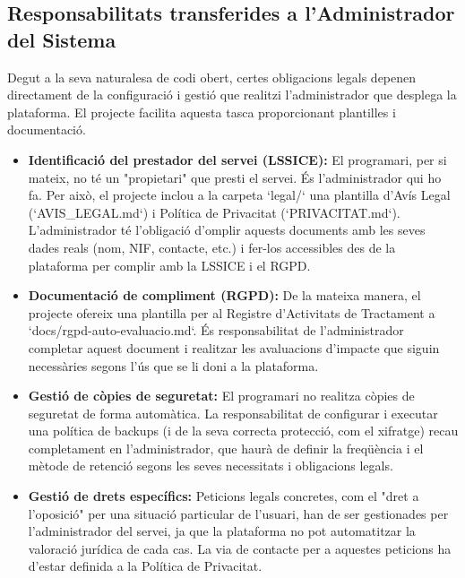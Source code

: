 \subsection{Responsabilitats transferides a l'Administrador del Sistema}

Degut a la seva naturalesa de codi obert, certes obligacions legals depenen directament de la configuració i gestió que realitzi l'administrador que desplega la plataforma. El projecte facilita aquesta tasca proporcionant plantilles i documentació.

\begin{itemize}
    \item \textbf{Identificació del prestador del servei (LSSICE):} El programari, per si mateix, no té un "propietari" que presti el servei. És l'administrador qui ho fa. Per això, el projecte inclou a la carpeta `legal/` una plantilla d'Avís Legal (`AVIS_LEGAL.md`) i Política de Privacitat (`PRIVACITAT.md`). L'administrador té l'obligació d'omplir aquests documents amb les seves dades reals (nom, NIF, contacte, etc.) i fer-los accessibles des de la plataforma per complir amb la LSSICE i el RGPD.

    \item \textbf{Documentació de compliment (RGPD):} De la mateixa manera, el projecte ofereix una plantilla per al Registre d'Activitats de Tractament a `docs/rgpd-auto-evaluacio.md`. És responsabilitat de l'administrador completar aquest document i realitzar les avaluacions d'impacte que siguin necessàries segons l'ús que se li doni a la plataforma.

    \item \textbf{Gestió de còpies de seguretat:} El programari no realitza còpies de seguretat de forma automàtica. La responsabilitat de configurar i executar una política de backups (i de la seva correcta protecció, com el xifratge) recau completament en l'administrador, que haurà de definir la freqüència i el mètode de retenció segons les seves necessitats i obligacions legals.

    \item \textbf{Gestió de drets específics:} Peticions legals concretes, com el "dret a l'oposició" per una situació particular de l'usuari, han de ser gestionades per l'administrador del servei, ja que la plataforma no pot automatitzar la valoració jurídica de cada cas. La via de contacte per a aquestes peticions ha d'estar definida a la Política de Privacitat.
\end{itemize}

